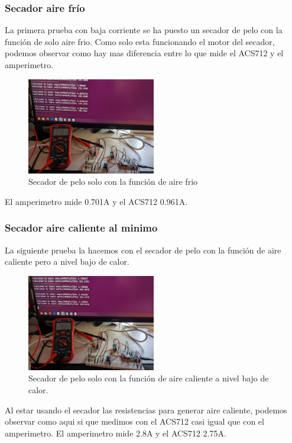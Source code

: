 \begin{titlepage}
\subsubsection{Secador aire frío}
La primera prueba con baja corriente se ha puesto un secador de pelo con la función de solo aire frio. Como solo esta funcionando el motor del secador, podemos observar como hay mas diferencia entre lo que mide el ACS712 y el amperimetro. \\
\begin{figure}[h!]
	\centering
	\includegraphics[width=0.5\textwidth]{imagenes/AC_O_7Amps.jpg}
	\caption{Secador de pelo solo con la función de aire frio}
\end{figure}
El amperimetro mide 0.701A y el ACS712 0.961A. \\

\subsubsection{Secador aire caliente al minimo}
La siguiente prueba la hacemos con el secador de pelo con la función de aire caliente pero a nivel bajo de calor.\\
\begin{figure}[h!]
	\centering
	\includegraphics[width=0.5\textwidth]{imagenes/AC_2_8Amps.jpg}
	\caption{Secador de pelo solo con la función de aire caliente a nivel bajo de calor.}
\end{figure}
Al estar usando el secador las resistencias para generar aire caliente, podemos observar como aqui si que medimos con el ACS712 casi igual que con el amperimetro.
El amperimetro mide 2.8A y el ACS712 2.75A. \\

\end{titlepage}
